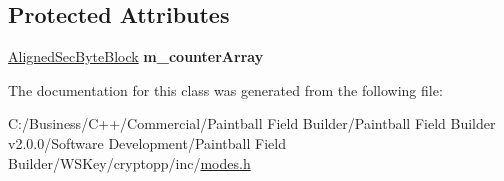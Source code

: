 \subsection*{Protected Attributes}
\begin{DoxyCompactItemize}
\item 
\hypertarget{class_c_t_r___mode_policy_ab7d861746395bb143a9a2a537cef5b50}{
\hyperlink{class_sec_block}{AlignedSecByteBlock} {\bfseries m\_\-counterArray}}
\label{class_c_t_r___mode_policy_ab7d861746395bb143a9a2a537cef5b50}

\end{DoxyCompactItemize}


The documentation for this class was generated from the following file:\begin{DoxyCompactItemize}
\item 
C:/Business/C++/Commercial/Paintball Field Builder/Paintball Field Builder v2.0.0/Software Development/Paintball Field Builder/WSKey/cryptopp/inc/\hyperlink{modes_8h}{modes.h}\end{DoxyCompactItemize}
